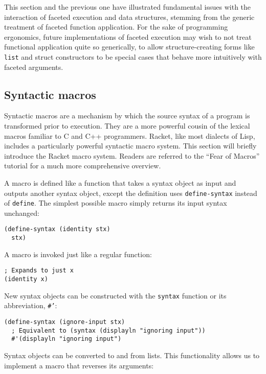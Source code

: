 \documentclass{article}
\begin{document}
This section and the previous one have illustrated fundamental issues with the interaction of faceted execution and data structures, stemming from the generic treatment of faceted function application. For the sake of programming ergonomics, future implementations of faceted execution may wish to not treat functional application quite so generically, to allow structure-creating forms like \texttt{list} and struct constructors to be special cases that behave more intuitively with faceted arguments.

\subsection{Syntactic macros}
Syntactic macros are a mechanism by which the source syntax of a program is transformed prior to execution. They are a more powerful cousin of the lexical macros familiar to C and C++ programmers. Racket, like most dialects of Lisp, includes a particularly powerful syntactic macro system. This section will briefly introduce the Racket macro system. Readers are referred to the ``Fear of Macros'' tutorial \cite{fear-of-macros} for a much more comprehensive overview.

A macro is defined like a function that takes a syntax object as input and outputs another syntax object, except the definition uses \texttt{define-syntax} instead of \texttt{define}. The simplest possible macro simply returns its input syntax unchanged:

\begin{lstlisting}
(define-syntax (identity stx)
  stx)
\end{lstlisting}

A macro is invoked just like a regular function:

\begin{lstlisting}
; Expands to just x
(identity x)
\end{lstlisting}

New syntax objects can be constructed with the \texttt{syntax} function or its abbreviation, \texttt{\#'}:

\begin{lstlisting}
(define-syntax (ignore-input stx)
  ; Equivalent to (syntax (displayln "ignoring input"))
  #'(displayln "ignoring input")
\end{lstlisting}

Syntax objects can be converted to and from lists. This functionality allows us to implement a macro that reverses its arguments:
\end{document}

